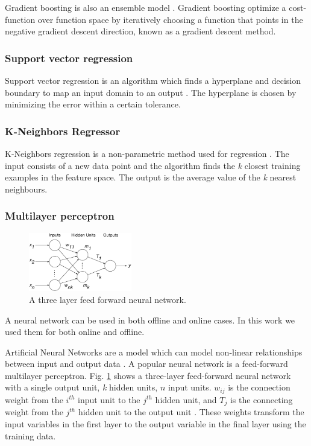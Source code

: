 \documentclass[final,3p,times,twocolumn,numbers]{elsarticle}
\begin{document}
Gradient boosting is also an ensemble model \cite{316}. Gradient boosting optimize a cost-function over function space by iteratively choosing a function that points in the negative gradient descent direction, known as a gradient descent method.

\subsubsection{Support vector regression}

Support vector regression is an algorithm which finds a hyperplane and decision boundary to map an input domain to an output \cite{Cortes1995}. The hyperplane is chosen by minimizing the error within a certain tolerance.

\subsubsection{K-Neighbors Regressor}

K-Neighbors regression is a non-parametric method used for regression \cite{forgy65}. The input consists of a new data point and the algorithm finds the \textit{k} closest training examples in the feature space. The output is the average value of the \textit{k} nearest neighbours.



\subsubsection{Multilayer perceptron}


\begin{figure}
\centering
    \includegraphics[width=0.4\textwidth]{figures/methods/Kell_eEnergy_Fig1.eps}
    \caption{A three layer feed forward neural network.}
    \label{fig:mlp}
\end{figure}

A neural network can be used in both offline and online cases. In this work we used them for both online and offline.

Artificial Neural Networks are a model which can model non-linear relationships between input and output data \cite{Akaike1974}. A popular neural network is a feed-forward multilayer perceptron. Fig. \ref{fig:mlp} shows a three-layer feed-forward neural network with a single output unit, \textit{k} hidden units, $n$ input units. $w_{ij}$ is the connection weight from the $i^{th}$ input unit to the $j^{th}$ hidden unit,  and $T_j$ is the connecting weight from the $j^{th}$ hidden unit to the output unit \cite{Pao2007}. These weights transform the input variables in the first layer to the output variable in the final layer using the training data. 
\end{document}
